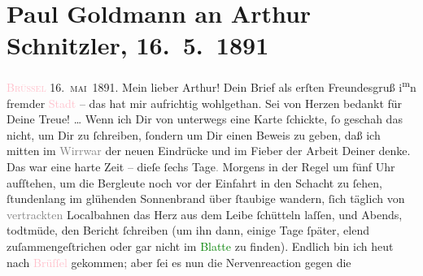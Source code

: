 

               \section[Paul Goldmann an Arthur Schnitzler, 16. 5. 1891]{ Paul Goldmann an Arthur Schnitzler, 16. 5. 1891}\nopagebreak{}\rehead{ }\normalsize\beginnumbering{} \toendnotes[C]{\smallbreak\pagebreak[2]} 
\toendnotes[C]{\smallbreak}\pstart
           \centering{}{\pb}\textsc{\textcolor{pink}{Brüssel}{}\ledrightnote{\textcolor{pink}{Brüssel}}}{ }16. \textsc{mai} 1891.\pend
           \pstart\center{}Mein lieber Arthur!\pend\pstart
           Dein Brief als erſten Freundesgruß i\substVorne{}\textsuperscript{m}\substDazwischen{}n\substHinten{} fremder \textcolor{pink}{Stadt}{} – das
               hat mir aufrichtig wohlgethan. Sei von Herzen bedankt für Deine Treue! {\dots} Wenn ich Dir von unterwegs eine Karte ſchickte, ſo
               geschah das nicht, um Dir zu ſchreiben, ſondern um Dir einen Beweis zu geben, daß ich
               mitten im \textcolor{gray}{Wirrwar} der neuen Eindrücke und im Fieber der Arbeit
               Deiner denke. Das war eine harte Zeit – dieſe ſechs Tage\textcolor{gray}{.} Morgens
               in der Regel um fünf Uhr aufſtehen, um die Bergleute noch vor der Einfahrt in den
               Schacht zu ſehen, ſtundenlang im glühenden Sonnenbrand über ſtaubige \label{K_L02663-5v}\label{K_L02663-5h} wandern,
               ſich täglich von \textcolor{gray}{vertrackten} Localbahnen das Herz aus dem Leibe
               ſchütteln laſſen, und Abends, todtmüde, den Bericht ſchreiben (um ihn dann\strikeout{)}, einige Tage ſpäter, elend zuſammengeſtrichen oder
               gar nicht im \textcolor{green}{Blatte}{} zu
               finden). Endlich  bin ich heut nach \textcolor{pink}{Brüſſel}{}\ledrightnote{\textcolor{pink}{Brüssel}} gekommen; aber ſei es nun die Nervenreaction gegen die
